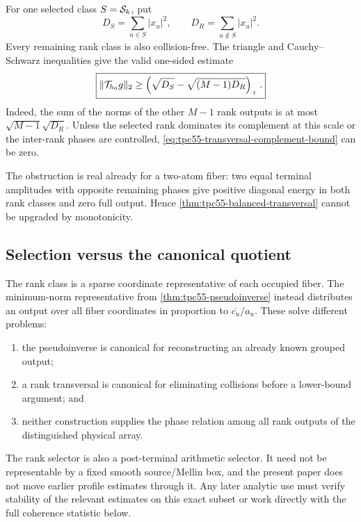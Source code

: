 For one selected class \(S=\mathcal S_k\), put
\begin{equation}
 D_S=\sum_{u\in S}|x_u|^2,
 \qquad
 D_R=\sum_{u\notin S}|x_u|^2.
 \label{eq:tpc55-selected-complement-energy}
\end{equation}
Every remaining rank class is also collision-free.  The triangle and
Cauchy--Schwarz inequalities give the valid one-sided estimate
\begin{equation}
 \boxed{
 \|\mathcal T_{h_0}g\|_2
 \ge
 \left(\sqrt{D_S}-\sqrt{(M-1)D_R}\right)_+.}
 \label{eq:tpc55-transversal-complement-bound}
\end{equation}
Indeed, the sum of the norms of the other \(M-1\) rank outputs is at most
\(\sqrt{M-1}\sqrt{D_R}\).  Unless the selected rank dominates its
complement at this scale or the inter-rank phases are controlled,
\eqref{eq:tpc55-transversal-complement-bound} can be zero.

The obstruction is real already for a two-atom fiber: two equal terminal
amplitudes with opposite remaining phases give positive diagonal energy in
both rank classes and zero full output.  Hence
\cref{thm:tpc55-balanced-transversal} cannot be upgraded by monotonicity.

\subsection{Selection versus the canonical quotient}

The rank class is a sparse coordinate representative of each occupied
fiber.  The minimum-norm representative from
\cref{thm:tpc55-pseudoinverse} instead distributes an output over all
fiber coordinates in proportion to \(\overline{c_u}/a_u\).  These solve
different problems:
\begin{enumerate}[label=\textup{(\roman*)},leftmargin=3em]
 \item the pseudoinverse is canonical for reconstructing an already known
       grouped output;
 \item a rank transversal is canonical for eliminating collisions before
       a lower-bound argument; and
 \item neither construction supplies the phase relation among all rank
       outputs of the distinguished physical array.
\end{enumerate}

The rank selector is also a post-terminal arithmetic selector.  It need not
be representable by a fixed smooth source/Mellin box, and the present paper
does not move earlier profile estimates through it.  Any later analytic
use must verify stability of the relevant estimates on this exact subset or
work directly with the full coherence statistic below.
